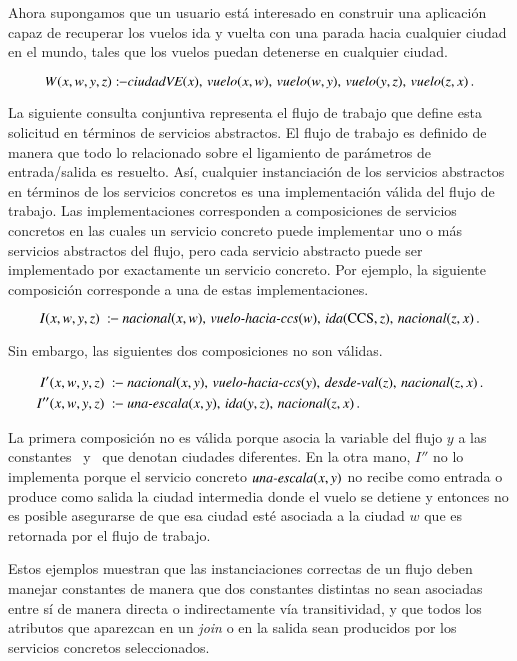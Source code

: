 Ahora supongamos que un usuario está interesado en construir una aplicación
capaz de recuperar los vuelos ida y vuelta con una parada hacia cualquier ciudad
en el mundo, tales que los vuelos puedan detenerse en cualquier ciudad.

\[ W(x,w,y,z) :\!\!- \text{\it ciudadVE}(x),\,\text{\it vuelo}(x,w),\,\text{\it vuelo}(w,y),\,\text{\it vuelo}(y,z),\,\text{\it vuelo}(z,x)\,. \]

La siguiente consulta conjuntiva representa el flujo de trabajo que define esta
solicitud en términos de servicios abstractos. El flujo de trabajo es definido
de manera que todo lo relacionado sobre el ligamiento de parámetros de
entrada/salida es resuelto. Así, cualquier instanciación de los servicios
abstractos en términos de los servicios concretos es una implementación válida
del flujo de trabajo. Las implementaciones corresponden a composiciones de
servicios concretos en las cuales un servicio concreto puede implementar uno o
más servicios abstractos del flujo, pero cada servicio abstracto puede ser
implementado por exactamente un servicio concreto. Por ejemplo, la siguiente
composición corresponde a una de estas implementaciones.

\[ I(x,w,y,z)\ \qrule\ \nacional(x,w),\,\vueloCCS(w),\,\ida(\PA,z),\,\nacional(z,x)\,. \]

Sin embargo, las siguientes dos composiciones no son válidas.

\begin{alignat*}{1}
I'(x,w,y,z)\  \qrule\ &\nacional(x,y),\,\vueloCCS(y),\,\desdeVAL(z),\,\nacional(z,x)\,. \\
I''(x,w,y,z)\ \qrule\ &\unaescala(x,y),\,\ida(y,z),\,\nacional(z,x)\,.
\end{alignat*}

La primera composición no es válida porque asocia la variable del flujo $y$ a
las constantes \PA\ y \NY\ que denotan ciudades diferentes. En la otra mano, $I''$
no lo implementa porque el servicio concreto $\text{\it una-escala}(x,y)$ no recibe como entrada
o produce como salida la ciudad intermedia donde el vuelo se detiene y entonces
no es posible asegurarse de que esa ciudad esté asociada a la ciudad $w$ que es
retornada por el flujo de trabajo.

Estos ejemplos muestran que las instanciaciones correctas de un flujo deben
manejar constantes de manera que dos constantes distintas no sean asociadas
entre sí de manera directa o indirectamente vía transitividad, y que todos los
atributos que aparezcan en un \emph{join} o en la salida sean producidos por los
servicios concretos seleccionados.

